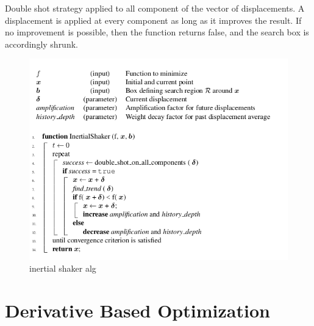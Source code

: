 \documentclass[10pt]{article}
\begin{document}
Double shot strategy applied to all component of the vector of displacements. A displacement
is applied at every component as long as it improves the result. If no improvement is possible, then the function returns false, and the search box is accordingly shrunk.

\begin{figure}
\includegraphics[scale=0.60]{is}
\caption{inertial shaker alg}
\centering
\end{figure}


\section{Derivative Based Optimization}
\end{document}
